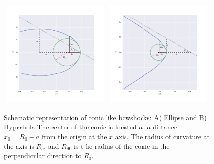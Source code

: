 \begin{figure}
\setlength\tabcolsep{0pt}
\begin{tabular}{cc}
\includegraphics[height=0.54\linewidth, trim=30 0 30 0, clip]{ellipse_py} &
\includegraphics[height=0.54\linewidth, trim=60 0 70 0, clip]{hyperbola_py}
\end{tabular}
\label{fig:conics}
\caption{Schematic representation of conic like bowshocks: A) Ellipse and B) Hyperbola The center of the conic is located at a distance $x_0=R_0-a$ from the origin at the $x$ axis. 
The radius of curvature at the axis is $R_c$, and $R_{90}$ is t he radius of the conic in the perpendicular direction to $R_0$.
}
\end{figure}
